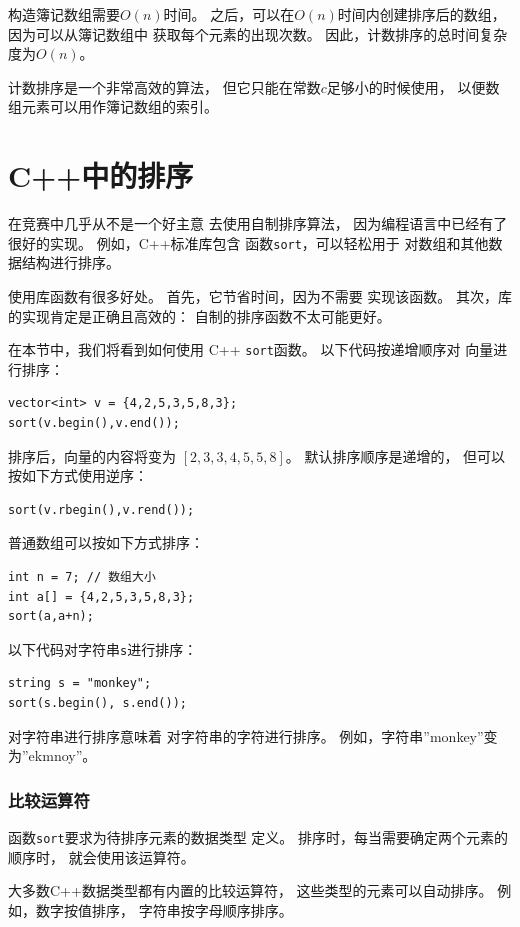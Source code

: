 构造簿记数组需要$O(n)$时间。
之后，可以在$O(n)$时间内创建排序后的数组，
因为可以从簿记数组中
获取每个元素的出现次数。
因此，计数排序的总时间复杂度为$O(n)$。

计数排序是一个非常高效的算法，
但它只能在常数$c$足够小的时候使用，
以便数组元素可以用作簿记数组的索引。

\section{C++中的排序}


在竞赛中几乎从不是一个好主意
去使用自制排序算法，
因为编程语言中已经有了
很好的实现。
例如，C++标准库包含
函数\texttt{sort}，可以轻松用于
对数组和其他数据结构进行排序。

使用库函数有很多好处。
首先，它节省时间，因为不需要
实现该函数。
其次，库的实现肯定是正确且高效的：
自制的排序函数不太可能更好。

在本节中，我们将看到如何使用
C++ \texttt{sort}函数。
以下代码按递增顺序对
向量进行排序：
\begin{lstlisting}
vector<int> v = {4,2,5,3,5,8,3};
sort(v.begin(),v.end());
\end{lstlisting}
排序后，向量的内容将变为
$[2,3,3,4,5,5,8]$。
默认排序顺序是递增的，
但可以按如下方式使用逆序：
\begin{lstlisting}
sort(v.rbegin(),v.rend());
\end{lstlisting}
普通数组可以按如下方式排序：
\begin{lstlisting}
int n = 7; // 数组大小
int a[] = {4,2,5,3,5,8,3};
sort(a,a+n);
\end{lstlisting}
\newpage
以下代码对字符串\texttt{s}进行排序：
\begin{lstlisting}
string s = "monkey";
sort(s.begin(), s.end());
\end{lstlisting}
对字符串进行排序意味着
对字符串的字符进行排序。
例如，字符串''monkey''变为''ekmnoy''。

\subsubsection{比较运算符}


函数\texttt{sort}要求为待排序元素的数据类型
定义。
排序时，每当需要确定两个元素的顺序时，
就会使用该运算符。

大多数C++数据类型都有内置的比较运算符，
这些类型的元素可以自动排序。
例如，数字按值排序，
字符串按字母顺序排序。

